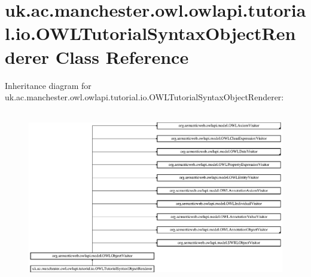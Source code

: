 \hypertarget{classuk_1_1ac_1_1manchester_1_1owl_1_1owlapi_1_1tutorial_1_1io_1_1_o_w_l_tutorial_syntax_object_renderer}{\section{uk.\-ac.\-manchester.\-owl.\-owlapi.\-tutorial.\-io.\-O\-W\-L\-Tutorial\-Syntax\-Object\-Renderer Class Reference}
\label{classuk_1_1ac_1_1manchester_1_1owl_1_1owlapi_1_1tutorial_1_1io_1_1_o_w_l_tutorial_syntax_object_renderer}
}
Inheritance diagram for uk.\-ac.\-manchester.\-owl.\-owlapi.\-tutorial.\-io.\-O\-W\-L\-Tutorial\-Syntax\-Object\-Renderer\-:\begin{figure}[H]
\begin{center}
\leavevmode
\includegraphics[height=7.619048cm]{classuk_1_1ac_1_1manchester_1_1owl_1_1owlapi_1_1tutorial_1_1io_1_1_o_w_l_tutorial_syntax_object_renderer}
\end{center}
\end{figure}
